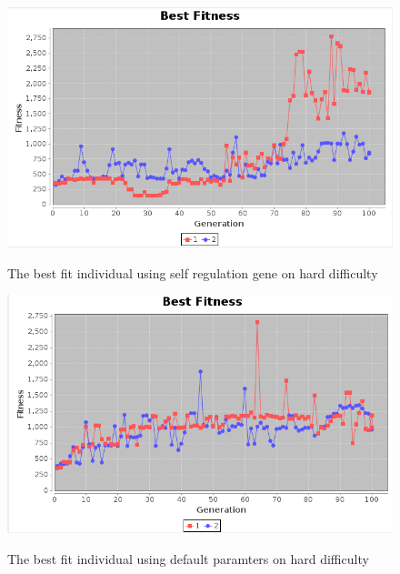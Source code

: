 \documentclass[12pt]{ucthesis} \newif\ifpdf \ifx\pdfoutput\undefined
\begin{document}
\begin{figure}[h!]
  \caption{The best fit individual using self regulation gene on hard
  difficulty}
  \centering
    \includegraphics[width=1\textwidth]{graphsone/selfreg_default_hard_best.png}
   \label{fig:selfreg_default_hard_best} 
\end{figure}

\begin{figure}[h!]
  \caption{The best fit individual using default paramters on hard difficulty}
  \centering
    \includegraphics[width=1\textwidth]{graphsone/default_hard_best.png}
   \label{fig:default_hard_best} 
\end{figure}
\end{document}
